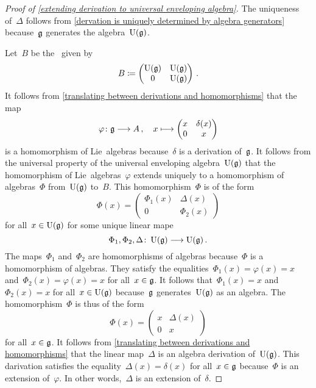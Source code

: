 \begin{proof}[Proof of \cref{extending derivation to universal enveloping algebra}]
  The uniqueness of~$\Delta$ follows from \cref{dervation is uniquely determined by algebra generators} because~$\mathfrak{g}$ generates the algebra~$\operatorname{U}(\mathfrak{g})$.

  Let~$B$ be the~\algebra{$\kf$} given by
  \[
    B
    \coloneqq
    \begin{pmatrix}
      \operatorname{U}(\mathfrak{g})  & \operatorname{U}(\mathfrak{g}) \\
      0             & \operatorname{U}(\mathfrak{g})
    \end{pmatrix} \,.
  \]
  It follows from \cref{translating between derivations and homomorphisms} that the map
  \[
    \varphi
    \colon
    \glie
    \to
    A \,,
    \quad
    x
    \mapsto
    \begin{pmatrix}
      x & \delta(x) \\
      0 & x
    \end{pmatrix}
  \]
  is a homomorphism of Lie~algebras because~$\delta$ is a derivation of~$\mathfrak{g}$.
  It follows from the universal property of the universal enveloping algebra~$\operatorname{U}(\mathfrak{g})$ that the homomorphism of Lie~algebras~$\varphi$ extends uniquely to a homomorphism of algebras~$\Phi$ from~$\operatorname{U}(\mathfrak{g})$ to~$B$.
  This homomorphism~$\Phi$ is of the form
  \[
    \Phi(x)
    =
    \begin{pmatrix}
      \Phi_1(x) & \Delta(x) \\
      0         & \Phi_2(x)
    \end{pmatrix}
  \]
  for all~$x \in \operatorname{U}(\mathfrak{g})$ for some unique linear mape
  \[
    \Phi_1, \Phi_2, \Delta
    \colon
    \Univ(\glie)
    \to
    \Univ(\glie) \,.
  \]
  The maps~$\Phi_1$ and~$\Phi_2$ are homomorphisms of algebras because~$\Phi$ is a homomorphism of algebras.
  They satisfy the equalities~$\Phi_1(x) = \varphi(x) = x$ and~$\Phi_2(x) = \varphi(x) = x$ for all~$x \in \mathfrak{g}$.
  It follows that~$\Phi_1(x) = x$ and~~$\Phi_2(x) = x$ for all~$x \in \operatorname{U}(\mathfrak{g})$ because~$\mathfrak{g}$ generates~$\operatorname{U}(\mathfrak{g})$ as an algebra.
  The homomorphism~$\Phi$ is thus of the form
  \[
    \Phi(x)
    =
    \begin{pmatrix}
      x & \Delta(x) \\
      0 & x
    \end{pmatrix}
  \]
  for all~$x \in \mathfrak{g}$.
  It follows from \cref{translating between derivations and homomorphisms} that the linear map~$\Delta$ is an algebra derivation of~$\operatorname{U}(\mathfrak{g})$.
  This darivation satisfies the equality~$\Delta(x) = \delta(x)$ for all~$x \in \mathfrak{g}$ because~$\Phi$ is an extension of~$\varphi$.
  In other words,~$\Delta$ is an extension of~$\delta$.
\end{proof}


